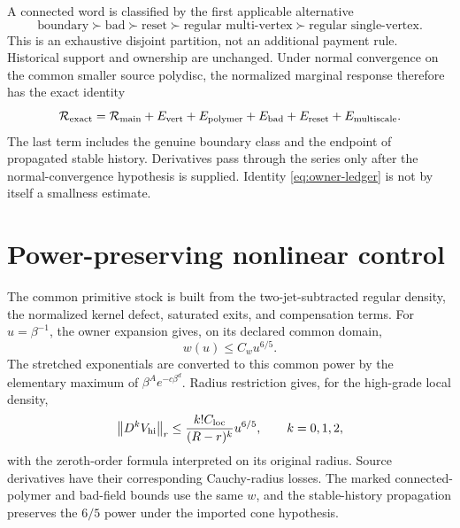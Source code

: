\documentclass[11pt,oneside,openany]{book}
\theoremstyle{definition}
\theoremstyle{remark}
\newcommand{\norm}[1]{\left\lVert#1\right\rVert}
\newcommand{\src}[2]{\cite[#2]{#1}}
\begin{document}
A connected word is classified by the first applicable alternative
\[
\text{boundary}\succ\text{bad}\succ\text{reset}\succ
\text{regular multi-vertex}\succ\text{regular single-vertex}.
\]
This is an exhaustive disjoint partition, not an additional payment rule. Historical support and ownership are unchanged. Under normal convergence on the common smaller source polydisc, the normalized marginal response therefore has the exact identity
\begin{equation}\label{eq:owner-ledger}
\mathcal R_{\rm exact}=\mathcal R_{\rm main}
+E_{\rm vert}+E_{\rm polymer}+E_{\rm bad}
+E_{\rm reset}+E_{\rm multiscale}.
\end{equation}
The last term includes the genuine boundary class and the endpoint of propagated stable history. Derivatives pass through the series only after the normal-convergence hypothesis is supplied. Identity \cref{eq:owner-ledger} is not by itself a smallness estimate. \src{PAR}{V1}

\section{Power-preserving nonlinear control}
The common primitive stock is built from the two-jet-subtracted regular density, the normalized kernel defect, saturated exits, and compensation terms. For $u=\beta^{-1}$, the owner expansion gives, on its declared common domain,
\begin{equation}\label{eq:owner-power}
w(u)\le C_wu^{6/5}.
\end{equation}
The stretched exponentials are converted to this common power by the elementary maximum of $\beta^Ae^{-c\beta^d}$. Radius restriction gives, for the high-grade local density,
\[
\norm{D^kV_{\rm hi}}_r\le\frac{k!C_{\rm loc}}{(R-r)^k}u^{6/5},
\qquad k=0,1,2,
\]
with the zeroth-order formula interpreted on its original radius. Source derivatives have their corresponding Cauchy-radius losses. The marked connected-polymer and bad-field bounds use the same $w$, and the stable-history propagation preserves the $6/5$ power under the imported cone hypothesis. \src{PAR}{V2--V3}
\end{document}
